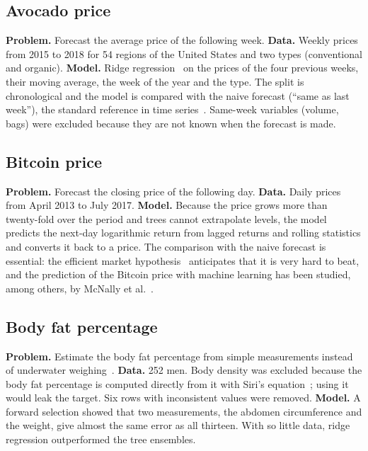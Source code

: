 \documentclass[11pt,letterpaper]{article}
\begin{document}
\subsection{Avocado price}

\textbf{Problem.} Forecast the average price of the following week. \textbf{Data.} Weekly prices from 2015 to 2018 for 54 regions of the United States and two types (conventional and organic). \textbf{Model.} Ridge regression~\cite{hoerl1970} on the prices of the four previous weeks, their moving average, the week of the year and the type. The split is chronological and the model is compared with the naive forecast (``same as last week''), the standard reference in time series~\cite{hyndman2021}. Same-week variables (volume, bags) were excluded because they are not known when the forecast is made.

\subsection{Bitcoin price}

\textbf{Problem.} Forecast the closing price of the following day. \textbf{Data.} Daily prices from April 2013 to July 2017. \textbf{Model.} Because the price grows more than twenty-fold over the period and trees cannot extrapolate levels, the model predicts the next-day logarithmic return from lagged returns and rolling statistics and converts it back to a price. The comparison with the naive forecast is essential: the efficient market hypothesis~\cite{fama1970} anticipates that it is very hard to beat, and the prediction of the Bitcoin price with machine learning has been studied, among others, by McNally et al.~\cite{mcnally2018}.

\subsection{Body fat percentage}

\textbf{Problem.} Estimate the body fat percentage from simple measurements instead of underwater weighing~\cite{johnson1996,penrose1985}. \textbf{Data.} 252 men. Body density was excluded because the body fat percentage is computed directly from it with Siri's equation~\cite{siri1956}; using it would leak the target. Six rows with inconsistent values were removed. \textbf{Model.} A forward selection showed that two measurements, the abdomen circumference and the weight, give almost the same error as all thirteen. With so little data, ridge regression outperformed the tree ensembles.
\end{document}
